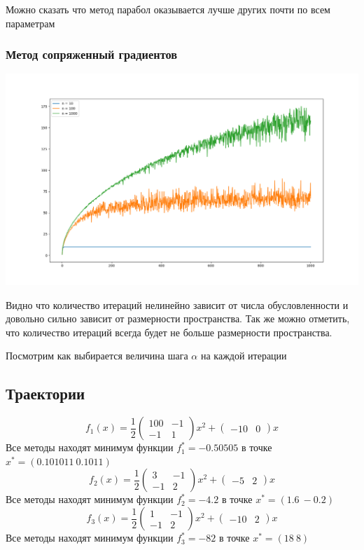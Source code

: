 \documentclass[english]{article}
\begin{document}
Можно сказать что метод парабол оказывается лучше других почти по всем параметрам

\subsubsection{Метод сопряженный градиентов}
\begin{center}
    \includegraphics[scale=0.4]{plots/conjugate_gradient_1.png}
\end{center}
Видно что количество итераций нелинейно зависит от числа
обусловленности и довольно сильно зависит от размерности
пространства. Так же можно отметить, что количество итераций всегда
будет не больше размерности пространства.

Посмотрим как выбирается величина шага \(\alpha\) на каждой итерации

\subsection{Траектории}
\[ f_1(x) = \frac{1}{2}\begin{pmatrix}
100 & -1 \\
-1 & 1
\end{pmatrix} x^2 + \begin{pmatrix} -10 & 0 \end{pmatrix}x\]
Все методы находят минимум функции \(f_1^* = -0.50505\) в точке \(x^* = (0.101011\ 0.1011)\)
\[ f_2(x) = \frac{1}{2}\begin{pmatrix}
3 & -1 \\
-1 & 2
\end{pmatrix} x^2 + \begin{pmatrix} -5 & 2 \end{pmatrix}x\]
Все методы находят минимум функции \(f_2^* = -4.2\) в точке \(x^* = (1.6\ -0.2)\)
\[ f_3(x) = \frac{1}{2}\begin{pmatrix}
1 & -1 \\
-1 & 2
\end{pmatrix} x^2 + \begin{pmatrix} -10 & 2 \end{pmatrix}x\]
Все методы находят минимум функции \(f_3^* = -82\) в точке \(x^* = (18\ 8)\) \\
\end{document}

